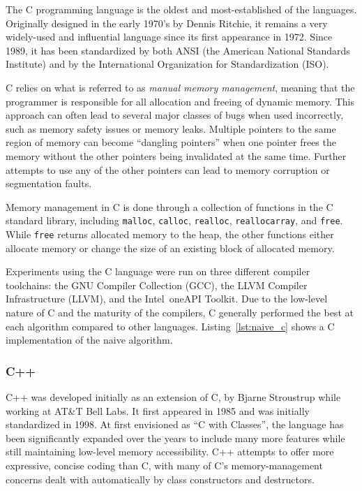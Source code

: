 The C programming language is the oldest and most-established of the languages. Originally designed in the early 1970's by Dennis Ritchie, it remains a very widely-used and influential language since its first appearance in 1972. Since 1989, it has been standardized by both ANSI (the American National Standards Institute) and by the International Organization for Standardization (ISO).

C relies on what is referred to as \textit{manual memory management}, meaning that the programmer is responsible for all allocation and freeing of dynamic memory. This approach can often lead to several major classes of bugs when used incorrectly, such as memory safety issues or memory leaks. Multiple pointers to the same region of memory can become ``dangling pointers'' when one pointer frees the memory without the other pointers being invalidated at the same time. Further attempts to use any of the other pointers can lead to memory corruption or segmentation faults.

Memory management in C is done through a collection of functions in the C standard library, including \texttt{malloc}, \texttt{calloc}, \texttt{realloc}, \texttt{reallocarray}, and \texttt{free}. While \texttt{free} returns allocated memory to the heap, the other functions either allocate memory or change the size of an existing block of allocated memory.

Experiments using the C language were run on three different compiler toolchains: the GNU Compiler Collection (GCC), the LLVM Compiler Infrastructure (LLVM), and the Intel\textregistered~oneAPI Toolkit. Due to the low-level nature of C and the maturity of the compilers, C generally performed the best at each algorithm compared to other languages. Listing~\ref{lst:naive_c} shows a C implementation of the naive algorithm.



\subsubsection{C++}

C++ was developed initially as an extension of C, by Bjarne Stroustrup while working at AT\&T Bell Labs. It first appeared in 1985 and was initially standardized in 1998. At first envisioned as ``C with Classes'', the language has been significantly expanded over the years to include many more features while still maintaining low-level memory accessibility. C++ attempts to offer more expressive, concise coding than C, with many of C's memory-management concerns dealt with automatically by class constructors and destructors.


